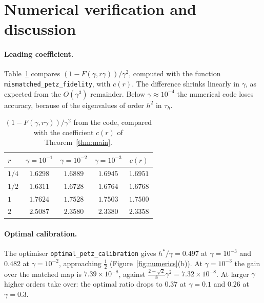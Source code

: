 \documentclass[11pt,a4paper]{article}
\theoremstyle{plain}
\begin{document}
\section{Numerical verification and discussion}\label{sec:numerics}

\paragraph{Leading coefficient.} Table~\ref{tab:check} compares $(1-F(\gamma,r\gamma))/\gamma^2$, computed with the function \texttt{mismatched\_\allowbreak petz\_\allowbreak fidelity}, with $c(r)$. The difference shrinks linearly in $\gamma$, as expected from the $O(\gamma^3)$ remainder. Below $\gamma\approx10^{-4}$ the numerical code loses accuracy, because of the eigenvalues of order $h^2$ in $\tau_h$.

\begin{table}[ht]
\centering
\renewcommand{\arraystretch}{1.2}
\begin{tabular}{@{}lcccc@{}}
\toprule
$r$ & $\gamma=10^{-1}$ & $\gamma=10^{-2}$ & $\gamma=10^{-3}$ & $c(r)$\\
\midrule
$1/4$ & $1.6298$ & $1.6889$ & $1.6945$ & $1.6951$\\
$1/2$ & $1.6311$ & $1.6728$ & $1.6764$ & $1.6768$\\
$1$ & $1.7624$ & $1.7528$ & $1.7503$ & $1.7500$\\
$2$ & $2.5087$ & $2.3580$ & $2.3380$ & $2.3358$\\
\bottomrule
\end{tabular}
\caption{$(1-F(\gamma,r\gamma))/\gamma^2$ from the code, compared with the coefficient $c(r)$ of Theorem~\ref{thm:main}.}
\label{tab:check}
\end{table}

\paragraph{Optimal calibration.} The optimiser \texttt{optimal\_\allowbreak petz\_\allowbreak calibration} gives $h^*/\gamma=0.497$ at $\gamma=10^{-3}$ and $0.482$ at $\gamma=10^{-2}$, approaching $\frac12$ (Figure~\ref{fig:numerics}(b)). At $\gamma=10^{-3}$ the gain over the matched map is $7.39\times10^{-8}$, against $\frac{2-\sqrt2}8\gamma^2=7.32\times10^{-8}$. At larger $\gamma$ higher orders take over: the optimal ratio drops to $0.37$ at $\gamma=0.1$ and $0.26$ at $\gamma=0.3$.
\end{document}
